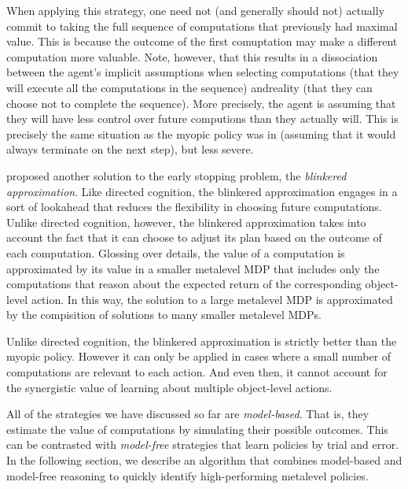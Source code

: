 When applying this strategy, one need not (and generally should not) actually commit to taking the full sequence of computations that previously had maximal value. This is because the outcome of the first comuptation may make a different computation more valuable. Note, however, that this results in a dissociation between the agent's implicit assumptions when selecting computations (that they will execute all the computations in the sequence) andreality (that they can choose not to complete the sequence). More precisely, the agent is assuming that they will have less control over future computions than they actually will. This is precisely the same situation as the myopic policy was in (assuming that it would always terminate on the next step), but less severe.

\citet{hay2012selecting} proposed another solution to the early stopping problem, the \emph{blinkered approximation}. Like directed cognition, the blinkered approximation engages in a sort of lookahead that reduces the flexibility in choosing future computations. Unlike directed cognition, however, the blinkered approximation takes into account the fact that it can choose to adjust its plan based on the outcome of each computation. Glossing over details, the value of a computation is approximated by its value in a smaller metalevel MDP that includes only the computations that reason about the expected return of the corresponding object-level action. In this way, the solution to a large metalevel MDP is approximated by the compisition of solutions to many smaller metalevel MDPs. 

Unlike directed cognition, the blinkered approximation is strictly better than the myopic policy. However it can only be applied in cases where a small number of computations are relevant to each action. And even then, it cannot account for the synergistic value of learning about multiple object-level actions. 

\separator

All of the strategies we have discussed so far are \emph{model-based}. That is, they estimate the value of computations by simulating their possible outcomes. This can be contrasted with \emph{model-free} strategies that learn policies by trial and error. In the following section, we describe an algorithm that combines model-based and model-free reasoning to quickly identify high-performing metalevel policies.


